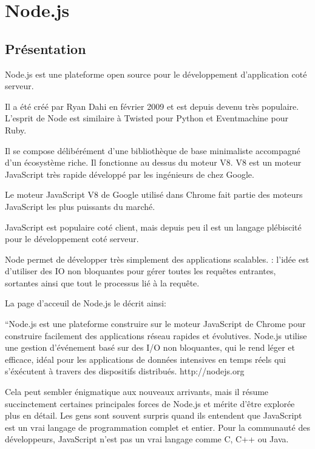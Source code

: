 \section{Node.js}
\label{ch:nodejs}

\subsection{Présentation}

Node.js est une plateforme open source pour le développement d’application coté serveur.

Il a été créé par Ryan Dahi en février 2009 et est depuis devenu très populaire. L’esprit de Node est similaire à Twisted pour Python et Eventmachine pour Ruby.

Il se compose délibérément d’une bibliothèque de base minimaliste accompagné d’un écosystème riche. Il fonctionne au dessus du moteur V8.  V8 est un moteur JavaScript très rapide développé par les ingénieurs de chez Google.

Le moteur JavaScript V8 de Google utilisé dans Chrome fait partie des moteurs JavaScript les plus puissants du marché.

JavaScript est populaire coté client, mais depuis peu il est un langage plébiscité pour le développement coté serveur.

Node permet de développer très simplement des applications scalables. : l'idée est d'utiliser des IO non bloquantes pour gérer toutes les requêtes entrantes, sortantes ainsi que tout le processus lié à la requête.




La page d’acceuil de Node.js le décrit ainsi:

“Node.js est une plateforme construire sur le moteur JavaScript de Chrome pour construire facilement des applications réseau rapides et évolutives. Node.js utilise une gestion d'événement basé sur des I/O non bloquantes, qui le rend léger et efficace, idéal pour les applications de données intensives en temps réels qui s’éxécutent à travers des dispositifs distribués. http://nodejs.org

Cela peut sembler énigmatique aux nouveaux arrivants, mais il résume succinctement certaines principales forces de Node.js et mérite d'être explorée plus en détail. Les gens sont souvent surpris quand ils entendent que JavaScript est un vrai langage de programmation complet et entier. Pour la communauté des développeurs, JavaScript n’est pas un vrai langage comme C, C++ ou Java.


